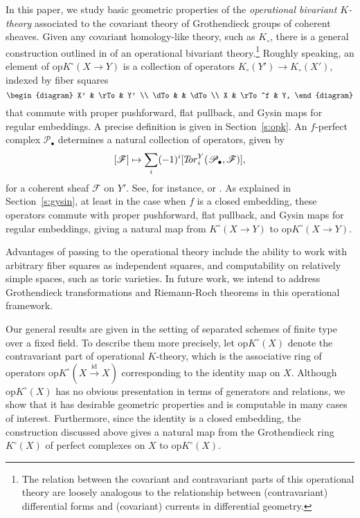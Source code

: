 \documentclass[11pt]{amsart}
\theoremstyle{definition}
\begin{document}
In this paper, we study basic geometric properties of the \emph{operational bivariant $K$-theory} associated to the covariant theory of Grothendieck groups of coherent sheaves.  Given any covariant homology-like theory, such as $K_\circ$, there is a general construction outlined in \cite[\S8]{bt} of an operational bivariant theory.\footnote{The relation between the covariant and contravariant parts of this operational theory are loosely analogous to the relationship between (contravariant) differential forms and (covariant) currents in differential geometry.}  Roughly speaking, an element of ${\mathrm{op}K}^\circ(X \rightarrow Y)$ is a collection of operators $K_\circ(Y') \rightarrow K_\circ(X')$, indexed by fiber squares
\[
\begin{diagram}
 X' & \rTo & Y' \\
 \dTo &  & \dTo \\
 X  & \rTo^f   & Y,
\end{diagram}  
\]
that commute with proper pushforward, flat pullback, and Gysin maps for regular embeddings.  A precise definition is given in Section~\ref{s:opk}.  An $f$-perfect complex ${\mathscr{P}}_\bullet$ determines a natural collection of operators, given by
\[
[{\mathscr{F}}] \mapsto \sum_i (-1)^i [{T\hspace{-.6ex}or}_i^Y({\mathscr{P}}_\bullet,{\mathscr{F}})], 
\]
for a coherent sheaf ${\mathscr{F}}$ on $Y'$.  See, for instance, \cite[Ex.~18.3.16]{it} or \cite[IV, 2.12]{sga6}.  As explained in Section~\ref{s:gysin}, at least in the case when $f$ is a closed embedding, these operators commute with proper pushforward, flat pullback, and Gysin maps for regular embeddings, giving a natural map from $K^\circ(X \rightarrow Y)$ to ${\mathrm{op}K}^\circ(X \rightarrow Y)$.

Advantages of passing to the operational theory include the ability to work with arbitrary fiber squares as independent squares, and computability on relatively simple spaces, such as toric varieties.  In future work, we intend to address Grothendieck transformations and Riemann-Roch theorems in this operational framework.

Our general results are given in the setting of separated schemes of finite type over a fixed field.  To describe them more precisely, let ${\mathrm{op}K}^\circ(X)$ denote the contravariant part of operational $K$-theory, which is the associative ring of operators ${\mathrm{op}K}^\circ(X \xrightarrow{\mathrm{id}} X)$ corresponding to the identity map on $X$.  Although ${\mathrm{op}K}^\circ(X)$ has no obvious presentation in terms of generators and relations, we show that it has desirable geometric properties and is computable in many cases of interest.  Furthermore, since the identity is a closed embedding, the construction discussed above gives a natural map from the Grothendieck ring $K^\circ(X)$ of perfect complexes on $X$ to ${\mathrm{op}K}^\circ(X)$.
\end{document}

